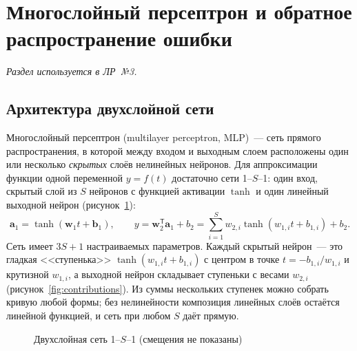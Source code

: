 \section{Многослойный персептрон и обратное распространение ошибки}
\label{sec:mlp}

\noindent\hspace{1.25cm}\emph{Раздел используется в ЛР~№3.}

\subsection{Архитектура двухслойной сети}

Многослойный персептрон (multilayer perceptron, MLP)~--- сеть прямого распространения, в которой между
входом и выходным слоем расположены один или несколько \emph{скрытых} слоёв нелинейных нейронов. Для
аппроксимации функции одной переменной $y = f(t)$ достаточно сети 1--$S$--1: один вход, скрытый слой из
$S$ нейронов с функцией активации $\tanh$ и один линейный выходной нейрон (рисунок~\ref{fig:mlp}):
\begin{equation}
\label{eq:mlp}
\mathbf{a}_1 = \tanh(\mathbf{w}_1 t + \mathbf{b}_1), \qquad
y = \mathbf{w}_2^{\mathsf T}\mathbf{a}_1 + b_2 = \sum_{i=1}^{S} w_{2,i}\tanh(w_{1,i} t + b_{1,i}) + b_2 .
\end{equation}
Сеть имеет $3S + 1$ настраиваемых параметров. Каждый скрытый нейрон~--- это гладкая <<ступенька>>
$\tanh(w_{1,i}t + b_{1,i})$ с центром в точке $t = -b_{1,i}/w_{1,i}$ и крутизной $w_{1,i}$, а выходной
нейрон складывает ступеньки с весами $w_{2,i}$ (рисунок~\ref{fig:contributions}). Из суммы нескольких
ступенек можно собрать кривую любой формы; без нелинейности композиция линейных слоёв остаётся
линейной функцией, и сеть при любом $S$ даёт прямую.

\begin{figure}[!htb]
\centering
{}
\caption{Двухслойная сеть 1--$S$--1 (смещения не показаны)}
\label{fig:mlp}
\end{figure}

